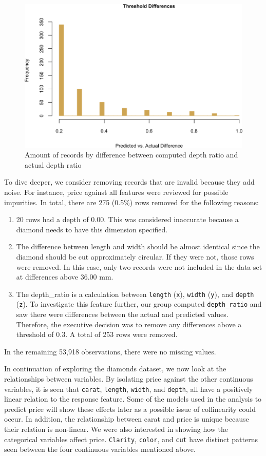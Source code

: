 \documentclass[
  paper=a4,
  ,captions=tableheading
]{scrartcl}
\begin{document}
\begin{figure}[H]

{\centering \includegraphics[width=0.5\linewidth,]{Diamonds_PDF_files/figure-latex/threshold diff hist-1} 

}

\caption{Amount of records by difference between computed depth ratio and actual depth ratio}\label{fig:threshold diff hist}
\end{figure}

To dive deeper, we consider removing records that are invalid because
they add noise. For instance, price against all features were reviewed
for possible impurities. In total, there are 275 (0.5\%) rows removed
for the following reasons:

\begin{enumerate}
\def\labelenumi{\arabic{enumi}.}
\item
  20 rows had a depth of 0.00. This was considered inaccurate because a
  diamond needs to have this dimension specified.
\item
  The difference between length and width should be almost identical
  since the diamond should be cut approximately circular. If they were
  not, those rows were removed. In this case, only two records were not
  included in the data set at differences above 36.00 mm.
\item
  The depth\_ratio is a calculation between \texttt{length}
  (\texttt{x}), \texttt{width} (\texttt{y}), and \texttt{depth}
  (\texttt{z}). To investigate this feature further, our group computed
  \texttt{depth\_ratio} and saw there were differences between the
  actual and predicted values. Therefore, the executive decision was to
  remove any differences above a threshold of 0.3. A total of 253 rows
  were removed.
\end{enumerate}

In the remaining 53,918 observations, there were no missing values.

In continuation of exploring the diamonds dataset, we now look at the
relationships between variables. By isolating price against the other
continuous variables, it is seen that \texttt{carat}, \texttt{length},
\texttt{width}, and \texttt{depth}, all have a positively linear
relation to the response feature. Some of the models used in the
analysis to predict price will show these effects later as a possible
issue of collinearity could occur. In addition, the relationship between
carat and price is unique because their relation is non-linear. We were
also interested in showing how the categorical variables affect price.
\texttt{Clarity}, \texttt{color}, and \texttt{cut} have distinct
patterns seen between the four continuous variables mentioned above.
\end{document}
